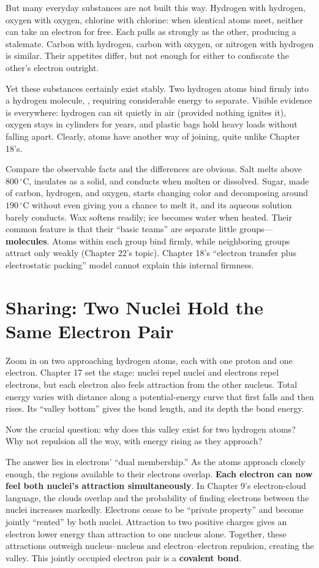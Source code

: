 But many everyday substances are not built this way. Hydrogen with hydrogen, oxygen with oxygen, chlorine with chlorine: when identical atoms meet, neither can take an electron for free. Each pulls as strongly as the other, producing a stalemate. Carbon with hydrogen, carbon with oxygen, or nitrogen with hydrogen is similar. Their appetites differ, but not enough for either to confiscate the other's electron outright.

Yet these substances certainly exist stably. Two hydrogen atoms bind firmly into a hydrogen molecule, , requiring considerable energy to separate. Visible evidence is everywhere: hydrogen can sit quietly in air (provided nothing ignites it), oxygen stays in cylinders for years, and plastic bags hold heavy loads without falling apart. Clearly, atoms have another way of joining, quite unlike Chapter 18's.

Compare the observable facts and the differences are obvious. Salt melts above $800\,^{\circ}\mathrm{C}$, insulates as a solid, and conducts when molten or dissolved. Sugar, made of carbon, hydrogen, and oxygen, starts changing color and decomposing around $190\,^{\circ}\mathrm{C}$ without even giving you a chance to melt it, and its aqueous solution barely conducts. Wax softens readily; ice becomes water when heated. Their common feature is that their ``basic teams'' are separate little groups---\textbf{molecules}. Atoms within each group bind firmly, while neighboring groups attract only weakly (Chapter 22's topic). Chapter 18's ``electron transfer plus electrostatic packing'' model cannot explain this internal firmness.

\section{Sharing: Two Nuclei Hold the Same Electron Pair}

Zoom in on two approaching hydrogen atoms, each with one proton and one electron. Chapter 17 set the stage: nuclei repel nuclei and electrons repel electrons, but each electron also feels attraction from the other nucleus. Total energy varies with distance along a potential-energy curve that first falls and then rises. Its ``valley bottom'' gives the bond length, and its depth the bond energy.

Now the crucial question: why does this valley exist for two hydrogen atoms? Why not repulsion all the way, with energy rising as they approach?

The answer lies in electrons' ``dual membership.'' As the atoms approach closely enough, the regions available to their electrons overlap. \textbf{Each electron can now feel both nuclei's attraction simultaneously}. In Chapter 9's electron-cloud language, the clouds overlap and the probability of finding electrons between the nuclei increases markedly. Electrons cease to be ``private property'' and become jointly ``rented'' by both nuclei. Attraction to two positive charges gives an electron lower energy than attraction to one nucleus alone. Together, these attractions outweigh nucleus--nucleus and electron--electron repulsion, creating the valley. This jointly occupied electron pair is a \textbf{covalent bond}.

